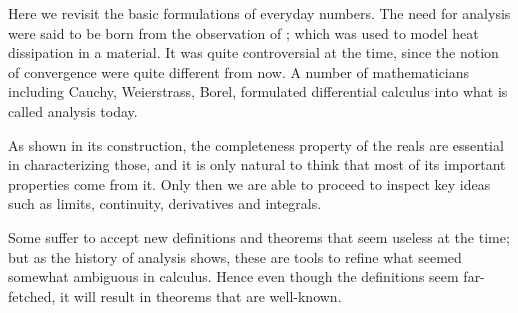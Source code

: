  \label{chap:PMA}

Here we revisit the basic formulations of everyday numbers.
The need for analysis were said to be born
from the observation of ;
which was used to model heat dissipation in a material.
It was quite controversial at the time,
since the notion of convergence were quite different from now.
A number of mathematicians including
Cauchy,
Weierstrass,
Borel,
formulated differential calculus into what is called analysis today.

As shown in its construction,
the completeness property of the reals are essential
in characterizing those,
and it is only natural to think that
most of its important properties come from it.
Only then we are able to proceed to inspect key ideas such as
limits,
continuity,
derivatives and integrals.

Some suffer to accept new definitions and theorems
that seem useless at the time;
but as the history of analysis shows,
these are tools to refine what seemed somewhat ambiguous in calculus.
Hence even though the definitions seem far-fetched,
it will result in theorems that are well-known.